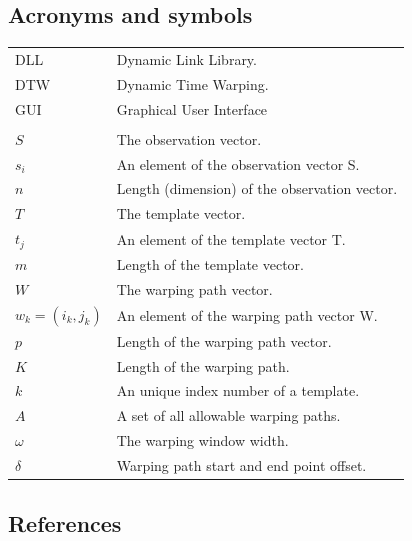\documentclass[a4paper,11pt]{article}
\begin{document}
\subsection{Acronyms and symbols}
\begin{tabular}{ll}
DLL 	& Dynamic Link Library. \\
DTW	& Dynamic Time Warping. \\
GUI & Graphical User Interface \\
\\
$S$	& The observation vector. \\
$s_i$	& An element of the observation vector S. \\
$n$	& Length (dimension) of the observation vector.\\
$T$	& The template vector. \\
$t_j$	& An element of the template vector T. \\
$m$	& Length of the template vector. \\
$W$	& The warping path vector. \\
$w_k=(i_k,j_k)$	& An element of the warping path vector W. \\
$p$	& Length of the warping path vector. \\
$K$	& Length of the warping path. \\
$k$	& An unique index number of a template.\\
$A$	& A set of all allowable warping paths. \\
$\omega$	& The warping window width. \\
$\delta$	& Warping path start and end point offset. \\
\end{tabular}

\subsection{References}
\end{document}
